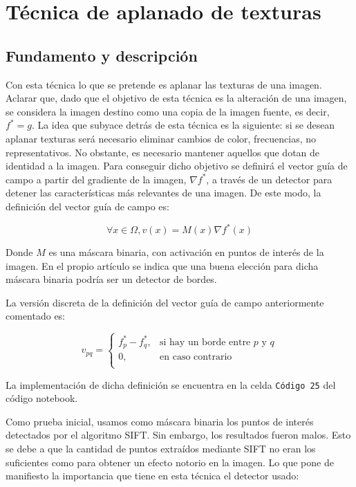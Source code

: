 \documentclass[11pt,twoside,titlepage,a4paper]{article}
\numberwithin{equation}{section} %
\theoremstyle{usual}
\begin{document}
\section{Técnica de aplanado de texturas}

\subsection{Fundamento y descripción}

Con esta técnica lo que se pretende es aplanar las texturas de una imagen. Aclarar que, dado que el objetivo de esta técnica es la alteración de una imagen, se considera la imagen destino como una copia de la imagen fuente, es decir, $f^* = g$. La idea que subyace detrás de esta técnica es la siguiente: si se desean aplanar texturas será necesario eliminar cambios de color, frecuencias, no representativos. No obstante, es necesario mantener aquellos que dotan de identidad a la imagen. Para conseguir dicho objetivo se definirá el vector guía de campo a partir del gradiente de la imagen, $\nabla f^*$, a través de un detector para detener las características más relevantes de una imagen. De este modo, la definición del vector guía de campo es:

\begin{equation}
    \forall x \in \Omega, v(x) = M(x) \nabla f^*(x)
\end{equation}

Donde $M$ es una máscara binaria, con activación en puntos de interés de la imagen. En el propio artículo \cite{poissonImageEditing} se indica que una buena elección para dicha máscara binaria podría ser un detector de bordes.

La versión discreta de la definición del vector guía de campo anteriormente comentado es:

\begin{equation}
    v_{pq}=\left\{
                \begin{array}{ll}
                  f_p^* - f_q^*, & \text{si hay un borde entre $p$ y $q$}\\
                  0, & \text{en caso contrario}\\
                \end{array}
          \right.
\end{equation}

La implementación de dicha definición se encuentra en la celda \texttt{Código 25} del código notebook.

Como prueba inicial, usamos como máscara binaria los puntos de interés detectados por el algoritmo SIFT. Sin embargo, los resultados fueron malos. Esto se debe a que la cantidad de puntos extraídos mediante SIFT no eran los suficientes como para obtener un efecto notorio en la imagen. Lo que pone de manifiesto la importancia que tiene en esta técnica el detector usado:
\end{document}

